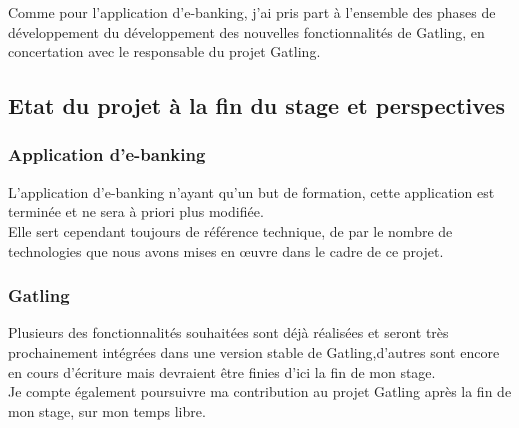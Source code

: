 Comme pour l'application d'e-banking, j'ai pris part à l'ensemble des phases de développement du développement des nouvelles fonctionnalités de Gatling, en concertation avec le responsable du projet Gatling.

\subsection{Etat du projet à la fin du stage et perspectives}

\subsubsection*{Application d'e-banking}

L'application d'e-banking n'ayant qu'un but de formation, cette application est terminée et ne sera à priori plus modifiée.\\
Elle sert cependant toujours de référence technique, de par le nombre de technologies que nous avons mises en œuvre dans le cadre de ce projet.

\subsubsection*{Gatling}

Plusieurs des fonctionnalités souhaitées sont déjà réalisées et seront très prochainement intégrées dans une version stable de Gatling,d'autres sont encore  en cours d'écriture mais devraient être finies d'ici la fin de mon stage.\\
Je compte également poursuivre ma contribution au projet Gatling après la fin de mon stage, sur mon temps libre.